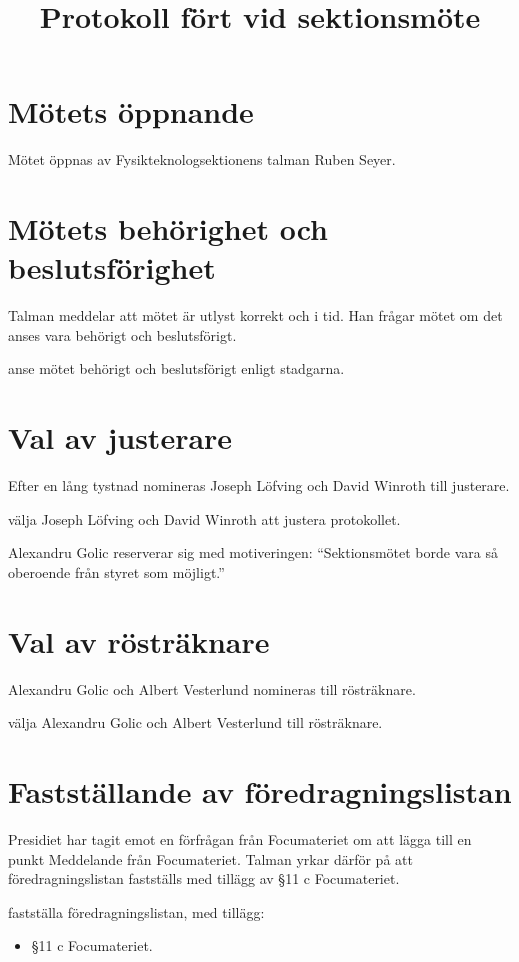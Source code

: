 \documentclass{sektionsmote}
\title{Protokoll fört vid sektionsmöte}
\begin{document}
\maketitle

\section{Mötets öppnande}
Mötet öppnas \tid av Fysikteknologsektionens talman Ruben Seyer.


\section{Mötets behörighet och beslutsförighet}
Talman meddelar att mötet är utlyst korrekt och i tid. Han frågar mötet om det anses vara behörigt och beslutsförigt.
\begin{beslut}
    \item anse mötet behörigt och beslutsförigt enligt stadgarna.
\end{beslut}


\section{Val av justerare}
Efter en lång tystnad nomineras Joseph Löfving och David Winroth till justerare.
\begin{beslut}
    \item välja Joseph Löfving och David Winroth att justera protokollet. 
\end{beslut}
Alexandru Golic reserverar sig med motiveringen: \enquote{Sektionsmötet borde vara så oberoende från styret som möjligt.}


\section{Val av rösträknare}
Alexandru Golic och Albert Vesterlund nomineras till rösträknare.
\begin{beslut}
    \item välja Alexandru Golic och Albert Vesterlund till rösträknare.
\end{beslut}


\section{Fastställande av föredragningslistan}
Presidiet har tagit emot en förfrågan från Focumateriet om att lägga till en punkt Meddelande från Focumateriet.
Talman yrkar därför på att föredragningslistan fastställs med tillägg av §11 c Focumateriet.
\begin{beslut}
    \item fastställa föredragningslistan, med tillägg: 
    \begin{itemize}
        \item §11 c Focumateriet.
    \end{itemize}
\end{beslut}
\end{document}

